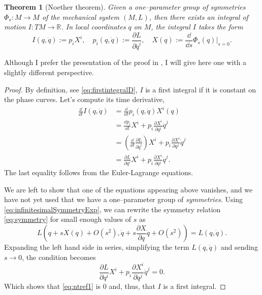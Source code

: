 \documentclass[english,fontsize=11pt,paper=b5]{scrbook}
\newtheorem{theorem}{Theorem}[chapter]
\theoremstyle{definition}
\begin{document}
    \begin{theorem}[Noether theorem]\label{thm:noether}
      Given a one--parameter group of symmetries $\Phi_s: M \to M$ of the mechanical system $(M,L)$, then there exists an integral of motion $I: TM \to \mathbb{R}$.
      In local coordinates $q$ on $M$, the integral $I$ takes the form
      \begin{equation}
        I(q,\dot q) := p_i X^i,
        \quad p_i(q, \dot q) := \frac{\partial L}{\partial \dot q^i},
        \quad X(q) := \frac{\dd}{\dd s} \Phi_s(q) \Big|_{s=0}.
      \end{equation}
    \end{theorem}

    Although I prefer the presentation of the proof in \cite[Chapter 20.B]{book:arnold}, I will give here one with a slightly different perspective.
    \begin{proof}
      By definition, see \eqref{eq:firstintegralD}, $I$ is a first integral if it is constant on the phase curves.
      Let's compute its time derivative,
      \begin{align}
        \frac{\dd}{\dd t} I(q, \dot q)
     & = \frac{\dd}{\dd t} p_i(q, \dot q) X^i(q)                                                                                 \\
     & = \frac{\dd p_i}{\dd t} X^i + p_i \frac{\partial X^i}{\partial q^j} \dot q^j                                              \\
     & = \left(\frac{\dd}{\dd t}\frac{\partial L}{\partial \dot q^i}\right) X^i + p_i \frac{\partial X^i}{\partial q^j} \dot q^j \\
     & = \frac{\partial L}{\partial q^i} X^i + p_i \frac{\partial X^i}{\partial q^j} \dot q^j. \label{eq:ntref1}
      \end{align}
      The last equality follows from the Euler-Lagrange equations.

      We are left to show that one of the equations appearing above vanishes, and we have not yet used that we have a one--parameter group of \emph{symmetries}.
      Using \eqref{eq:infinitesimalSymmetryExp}, we can rewrite the symmetry relation \eqref{eq:symmetry} for small enough values of $s$ as
      \begin{equation}\label{eq:invariance}
        L\left( q + s X(q) + O(s^2), \dot q + s \frac{\partial X}{\partial q} \dot q + O(s^2) \right) = L(q, \dot q).
      \end{equation}
      Expanding the left hand side in series, simplifying the term $L(q, \dot q)$ and sending $s\to 0$, the condition becomes
      \begin{equation}\label{eq:ntref2}
        \frac{\partial L}{\partial q^i} X^i + p_i \frac{\partial X^i}{\partial q^j} \dot q^j = 0.
      \end{equation}
      Which shows that \eqref{eq:ntref1} is $0$ and, thus, that $I$ is a first integral.
    \end{proof}
\end{document}
